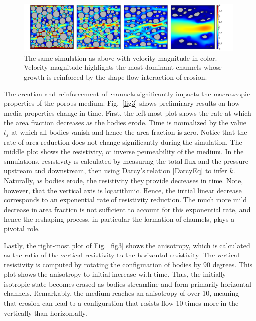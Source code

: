 \documentclass[11pt]{article}
\newcommand{\vsp}[1]{\vspace{#1 pc} \noindent}
\begin{document}
\begin{figure}%
\begin{center}
\includegraphics[width = 0.99 \textwidth]{./figs/80circ8vel.pdf}
\caption{\label{fig2} The same simulation as above with velocity magnitude in color. Velocity magnitude highlights the most dominant channels whose growth is reinforced by the shape-flow interaction of erosion.}
\end{center}
\end{figure}
 
 
 \vsp{5}
 
The creation and reinforcement of channels significantly impacts the macroscopic properties of the porous medium. Fig.~\ref{fig3} shows preliminary results on how media properties change in time. First, the left-most plot shows the rate at which the area fraction decreases as the bodies erode. Time is normalized by the value $t_f$ at which all bodies vanish and hence the area fraction is zero. Notice that the rate of area reduction does not change significantly during the simulation. The middle plot shows the resistivity, or inverse permeability of the medium. In the simulations, resistivity is calculated by measuring the total flux and the pressure upstream and downstream, then using Darcy's relation \eqref{DarcyEq} to infer $k$. Naturally, as bodies erode, the resistivity they provide decreases in time. Note, however, that the vertical axis is logarithmic. Hence, the initial linear decrease corresponds to an exponential rate of resistivity reduction. The much more mild decrease in area fraction is not sufficient to account for this exponential rate, and hence the reshaping process, in particular the formation of channels, plays a pivotal role.

Lastly, the right-most plot of Fig.~\ref{fig3} shows the anisotropy, which is calculated as the ratio of the vertical resistivity to the horizontal resistivity. The vertical resistivity is computed by rotating the configuration of bodies by 90 degrees. This plot shows the anisotropy to initial increase with time. Thus, the initially isotropic state becomes erased as bodies streamline and form primarily horizontal channels. Remarkably, the medium reaches an anisotropy of over 10, meaning that erosion can lead to a configuration that resists flow 10 times more in the vertically than horizontally.
\end{document}
